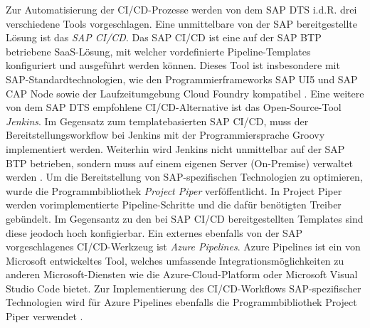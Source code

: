 Zur Automatisierung der CI/CD-Prozesse werden von dem SAP DTS i.d.R. drei verschiedene Tools vorgeschlagen. Eine unmittelbare von der SAP bereitgestellte Lösung ist das \textit{\ac{SAP CI/CD}}. Das SAP CI/CD ist eine auf der SAP BTP betriebene SaaS-Lösung, mit welcher vordefinierte Pipeline-Templates konfiguriert und ausgeführt werden können. Dieses Tool ist insbesondere mit SAP-Standardtechnologien, wie den Programmierframeworks SAP UI5 und SAP CAP Node sowie der Laufzeitumgebung Cloud Foundry kompatibel \cite{.20230405}. Eine weitere von dem SAP DTS empfohlene CI/CD-Alternative ist das Open-Source-Tool \textit{Jenkins}. Im Gegensatz zum templatebasierten SAP CI/CD, muss der Bereitstellungsworkflow bei Jenkins mit der Programmiersprache Groovy implementiert werden. Weiterhin wird Jenkins nicht unmittelbar auf der SAP BTP betrieben, sondern muss auf einem eigenen Server (On-Premise) verwaltet werden \cite[266]{Belmont.2018}. Um die Bereitstellung von SAP-spezifischen Technologien zu optimieren, wurde die Programmbibliothek \textit{Project Piper} verföffentlicht. In Project Piper werden vorimplementierte Pipeline-Schritte und die dafür benötigten Treiber gebündelt. Im Gegensantz zu den bei SAP CI/CD bereitgestellten Templates sind diese jeodoch hoch konfigierbar.
Ein externes ebenfalls von der SAP vorgeschlagenes CI/CD-Werkzeug ist \textit{Azure Pipelines}. Azure Pipelines ist ein von Microsoft entwickeltes Tool, welches umfassende Integrationsmöglichkeiten zu anderen Microsoft-Diensten wie die Azure-Cloud-Platform oder Microsoft Visual Studio Code bietet. Zur Implementierung des CI/CD-Workflows SAP-spezifischer Technologien wird für Azure Pipelines ebenfalls die Programmbibliothek Project Piper verwendet \cite{Naveen.20230224}.
